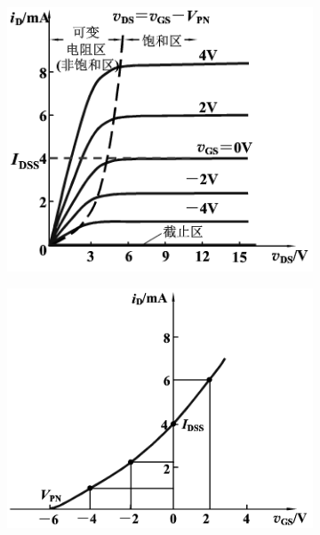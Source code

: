 \begin{figure}[H]
  \centering
  \begin{subfigure}{.45\textwidth}
    \centering
    \includegraphics[width=\linewidth]{figures/DNMOSIV1}
  \end{subfigure}
  \begin{subfigure}{.5\textwidth}
    \centering
    \includegraphics[width=\linewidth]{figures/DNMOSIV2}
  \end{subfigure}
\end{figure}

